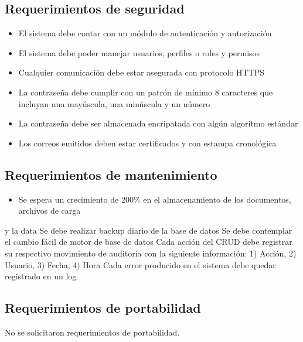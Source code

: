 \documentclass[letterpaper,10pt,spanish]{sphinxmanual}
\begin{document}
\subsection{Requerimientos de seguridad}
\label{\detokenize{SRS:requerimientos-de-seguridad}}\begin{itemize}
\item {} 
\sphinxAtStartPar
El sistema debe contar con un módulo de autenticación y autorización

\item {} 
\sphinxAtStartPar
El sistema debe poder manejar usuarios, perfiles o roles y permisos

\item {} 
\sphinxAtStartPar
Cualquier comunicación debe estar asegurada con protocolo HTTPS

\item {} 
\sphinxAtStartPar
La contraseña debe cumplir con un patrón de mínimo 8 caracteres que incluyan una mayúscula, una minúscula y un número

\item {} 
\sphinxAtStartPar
La contraseña debe ser almacenada encripatada con algún algoritmo estándar

\item {} 
\sphinxAtStartPar
Los correos emitidos deben estar certificados y con estampa cronológica

\end{itemize}


\subsection{Requerimientos de mantenimiento}
\label{\detokenize{SRS:requerimientos-de-mantenimiento}}\begin{itemize}
\item {} 
\sphinxAtStartPar
Se espera un crecimiento de 200\% en el almacenamiento de los documentos, archivos de carga

\end{itemize}

\sphinxAtStartPar
y la data
\sphinxhyphen{} Se debe realizar backup diario de la base de datos
\sphinxhyphen{} Se debe contemplar el cambio fácil de motor de base de datos
\sphinxhyphen{} Cada acción del CRUD debe registrar su respectivo movimiento de auditoría con la
siguiente información: 1) Acción, 2) Usuario, 3) Fecha, 4) Hora
\sphinxhyphen{} Cada error producido en el sistema debe quedar registrado en un log


\subsection{Requerimientos de portabilidad}
\label{\detokenize{SRS:requerimientos-de-portabilidad}}
\sphinxAtStartPar
No se solicitaron requerimientos de portabilidad.
\end{document}
